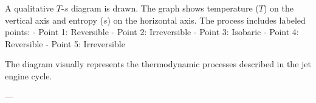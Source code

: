 A qualitative \( T \)-\( s \) diagram is drawn. The graph shows temperature (\( T \)) on the vertical axis and entropy (\( s \)) on the horizontal axis. The process includes labeled points:  
- Point 1: Reversible  
- Point 2: Irreversible  
- Point 3: Isobaric  
- Point 4: Reversible  
- Point 5: Irreversible  

The diagram visually represents the thermodynamic processes described in the jet engine cycle.

---